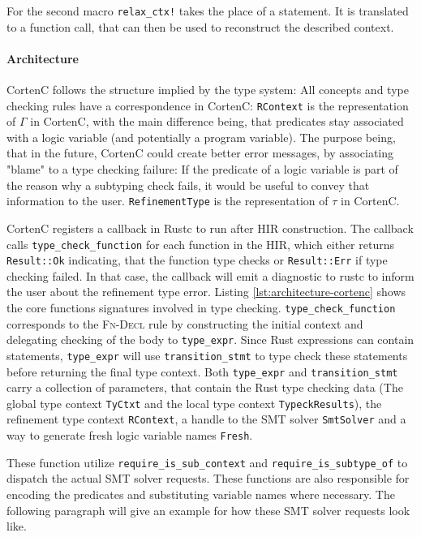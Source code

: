 \documentclass{book}
\newcommand{\code}[1]{\texttt{#1}}
\theoremstyle{definition}
\begin{document}
For the second macro \code{relax\_ctx!} takes the place of a statement. 
It is translated to a function call, that can then be used to reconstruct the described context.

\paragraph{Architecture}
CortenC follows the structure implied by the type system: All concepts and type checking rules have a correspondence in CortenC:
\code{RContext} is the representation of $\Gamma$ in CortenC, with the main difference being, that predicates stay associated with a logic variable (and potentially a program variable). The purpose being, that in the future, CortenC could create better error messages, by associating "blame" to a type checking failure: If the predicate of a logic variable is part of the reason why a subtyping check fails, it would be useful to convey that information to the user. 
\code{RefinementType} is the representation of $\tau$ in CortenC.

CortenC registers a callback in Rustc to run after HIR construction. The callback calls \code{type\_check\_function} for each function in the HIR, which either returns \code{Result::Ok} indicating, that the function type checks or \code{Result::Err} if type checking failed. In that case, the callback will emit a diagnostic to rustc to inform the user about the refinement type error.
Listing \ref{lst:architecture-cortenc} shows the core functions signatures involved in type checking. \code{type\_check\_function} corresponds to the \textsc{Fn-Decl} rule by constructing the initial context and delegating checking of the body to \code{type\_expr}. 
Since Rust expressions can contain statements, \code{type\_expr} will use \code{transition\_stmt} to type check these statements before returning the final type context.
Both \code{type\_expr} and \code{transition\_stmt} carry a collection of parameters, that contain the Rust type checking data (The global type context \code{TyCtxt} and the local type context \code{TypeckResults}), the refinement type context \code{RContext}, a handle to the SMT solver \code{SmtSolver} and a way to generate fresh logic variable names \code{Fresh}.

These function utilize \code{require\_is\_sub\_context} and \code{require\_is\_subtype\_of} to dispatch the actual SMT solver requests. These functions are also responsible for encoding the predicates and substituting variable names where necessary. 
The following paragraph will give an example for how these SMT solver requests look like.
\end{document}
